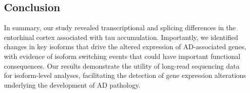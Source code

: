 \subsection{Conclusion}
In summary, our study revealed transcriptional and splicing differences in the entorhinal cortex associated with tau accumulation. Importantly, we identified changes in key isoforms that drive the altered expression of AD-associated genes, with evidence of isoform switching events that could have important functional consequences. Our results demonstrate the utility of long-read sequencing data for isoform-level analyses, facilitating the detection of gene expression alterations underlying the development of AD pathology. 